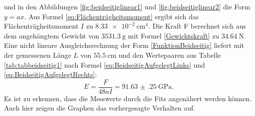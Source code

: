 und in den Abbildungen \ref{fig:beidseitiglinear1} und \ref{fig:beidseitiglinear2} die Form $y=a x$. Aus Formel \eqref{eq:Flächenträgheitsmoment} ergibt sich das Flächenträgheitsmoment $I$ zu $\SI{8.33e-2}{\centi\meter\tothe{4}}$.  Die Kraft F berechnet sich aus dem angehängtem Gewicht von $\SI{3531.3}{\gram}$ mit Formel \eqref{Gewichtskraft} zu $\SI{34.64}{\newton}$. Eine nicht lineare Ausgleichsrechnung der Form \eqref{FunktionBeidseitig} liefert mit der gemessenen Länge $L$ von $\SI{55.5}{\centi\meter}$ und den Wertepaaren aus Tabelle \ref{tab:tabbeidseitig1} nach Formel \eqref{eq:BeidseitigAufgelegtLinks} und \eqref{eq:BeidseitigAufgelegtRechts}:
\begin{displaymath}
E = \frac{F}{48 a I}= \SI{91.63(25)}{\giga\pascal}\text{.}
\end{displaymath}
Es ist zu erkennen, dass die Messwerte durch die Fits angenähert werden können. Auch hier zeigen die Graphen das vorhergesagte Verhalten auf.
